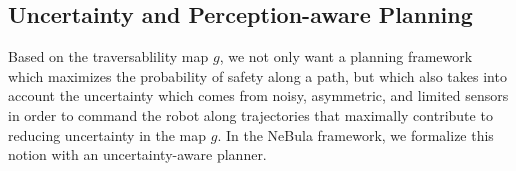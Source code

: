 \documentclass[letterpaper, 10pt, conference]{ieeeconf}      %
\newcommand{\ph}[1]{{\textbf{#1}:}} %
\newcommand{\rev}[1]{{\color{blue} #1 }} %
\begin{document}

\subsection{Uncertainty and Perception-aware Planning} 
\rev{Based on the traversablility map $g$, we not only want a planning framework which maximizes the probability of safety along a path, but which also takes into account the uncertainty which comes from noisy, asymmetric, and limited sensors in order to command the robot along trajectories that maximally contribute to reducing uncertainty in the map $g$.}In the NeBula framework, we formalize this notion with an uncertainty-aware planner.


\end{document}
